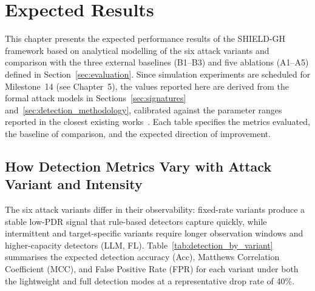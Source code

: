 \documentclass[12pt, a4paper]{report}
\begin{document}
\chapter{Expected Results}
\label{chap:results}

This chapter presents the expected performance results of the SHIELD-GH framework
based on analytical modelling of the six attack variants and comparison with
the three external baselines (B1--B3) and five ablations (A1--A5) defined in
Section~\ref{sec:evaluation}. Since simulation experiments are scheduled for
Milestone~14 (see Chapter~5), the values reported here are
derived from the formal attack models in Sections~\ref{sec:signatures}
and~\ref{sec:detection_methodology}, calibrated against the parameter ranges
reported in the closest existing works~\cite{malik2023greyhole,
alabdulatif2024mitigating, ahsan2024flbert}. Each table specifies the
metrics evaluated, the baseline of comparison, and the expected direction
of improvement.

\section{How Detection Metrics Vary with Attack Variant and Intensity}

The six attack variants differ in their observability: fixed-rate variants
produce a stable low-PDR signal that rule-based detectors capture quickly,
while intermittent and target-specific variants require longer observation
windows and higher-capacity detectors (LLM, FL). Table~\ref{tab:detection_by_variant}
summarises the expected detection accuracy (Acc), Matthews Correlation
Coefficient (MCC), and False Positive Rate (FPR) for each variant under both
the lightweight and full detection modes at a representative drop rate of
40\%.
\end{document}
